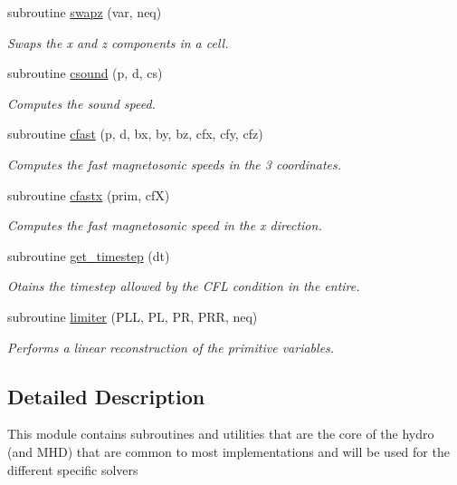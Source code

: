 \begin{DoxyCompactItemize}
subroutine \hyperlink{namespacehydro__core_ae4216bc7908e7665f0565aa8c885c821}{swapz} (var, neq)
\begin{DoxyCompactList}\small\item\em Swaps the x and z components in a cell. \end{DoxyCompactList}\item 
subroutine \hyperlink{namespacehydro__core_a27cb7ddb40cc0226e0139bd9eba42dfa}{csound} (p, d, cs)
\begin{DoxyCompactList}\small\item\em Computes the sound speed. \end{DoxyCompactList}\item 
subroutine \hyperlink{namespacehydro__core_ab2655b81626d4d95cb003112248e928a}{cfast} (p, d, bx, by, bz, cfx, cfy, cfz)
\begin{DoxyCompactList}\small\item\em Computes the fast magnetosonic speeds in the 3 coordinates. \end{DoxyCompactList}\item 
subroutine \hyperlink{namespacehydro__core_abd089f71325e32997703c1420db62aa8}{cfastx} (prim, cf\+X)
\begin{DoxyCompactList}\small\item\em Computes the fast magnetosonic speed in the x direction. \end{DoxyCompactList}\item 
subroutine \hyperlink{namespacehydro__core_a0b0402ba5c94d738eb020f79783f8d53}{get\+\_\+timestep} (dt)
\begin{DoxyCompactList}\small\item\em Otains the timestep allowed by the C\+F\+L condition in the entire. \end{DoxyCompactList}\item 
subroutine \hyperlink{namespacehydro__core_ada63ca89d1a40cfd1a62db0ddfdbda80}{limiter} (P\+L\+L, P\+L, P\+R, P\+R\+R, neq)
\begin{DoxyCompactList}\small\item\em Performs a linear reconstruction of the primitive variables. \end{DoxyCompactList}\end{DoxyCompactItemize}


\subsection{Detailed Description}
This module contains subroutines and utilities that are the core of the hydro (and M\+H\+D) that are common to most implementations and will be used for the different specific solvers 

